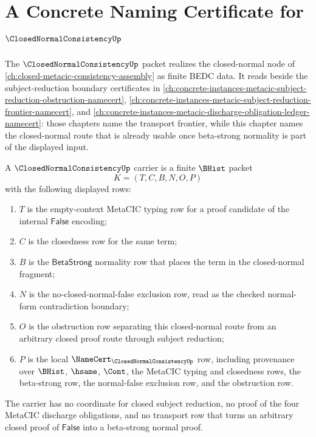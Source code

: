 \chapter{A Concrete Naming Certificate for $\ClosedNormalConsistencyUp$}
\label{ch:concrete-instances-closednormalconsistency-namecert}

The $\ClosedNormalConsistencyUp$ packet realizes the closed-normal node of \autoref{ch:closed-metacic-consistency-assembly} as finite BEDC data. It reads beside the subject-reduction boundary certificates in \autoref{ch:concrete-instances-metacic-subject-reduction-obstruction-namecert}, \autoref{ch:concrete-instances-metacic-subject-reduction-frontier-namecert}, and \autoref{ch:concrete-instances-metacic-discharge-obligation-ledger-namecert}: those chapters name the transport frontier, while this chapter names the closed-normal route that is already usable once beta-strong normality is part of the displayed input.

\begin{definition}
\label{def:closed-normal-consistency-namecert-carrier}
A $\ClosedNormalConsistencyUp$ carrier is a finite $\BHist$ packet
$$
K=(T,C,B,N,O,P)
$$
with the following displayed rows:
\begin{enumerate}
\item $T$ is the empty-context MetaCIC typing row for a proof candidate of the internal $\mathsf{False}$ encoding;
\item $C$ is the closedness row for the same term;
\item $B$ is the $\mathsf{BetaStrong}$ normality row that places the term in the closed-normal fragment;
\item $N$ is the no-closed-normal-false exclusion row, read as the checked normal-form contradiction boundary;
\item $O$ is the obstruction row separating this closed-normal route from an arbitrary closed proof route through subject reduction;
\item $P$ is the local $\NameCert_{\ClosedNormalConsistencyUp}$ row, including provenance over $\BHist$, $\hsame$, $\Cont$, the MetaCIC typing and closedness rows, the beta-strong row, the normal-false exclusion row, and the obstruction row.
\end{enumerate}
The carrier has no coordinate for closed subject reduction, no proof of the four MetaCIC discharge obligations, and no transport row that turns an arbitrary closed proof of $\mathsf{False}$ into a beta-strong normal proof.
\end{definition}

